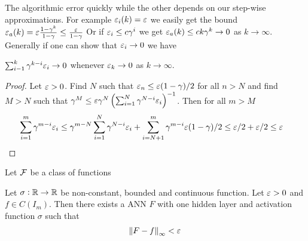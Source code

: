 The algorithmic error quickly while the other depends on our
step-wise approximations. For example
$\varepsilon_i(k) = \varepsilon$ we easily get the bound
$ \varepsilon_a(k) = \varepsilon \frac{1-\gamma^k}{1-\gamma} \leq \frac{\varepsilon}{1-\gamma} $
Or if $\varepsilon_i \leq c\gamma^i$ we get $\varepsilon_a(k) \leq ck \gamma^k \to 0$ as
$k \to \infty$.
Generally if one can show that $\varepsilon_i \to 0$ we have
\begin{prop} $ \sum_{i-1}^k \gamma^{k-i} \varepsilon_i \to 0 $
  whenever $\varepsilon_k \to 0$ as $k \to \infty$.
\end{prop}
\begin{proof}
  Let $\varepsilon > 0$. Find $N$ such that $\varepsilon_n \leq \varepsilon (1-\gamma)/2$ 
  for all $n>N$ and find $M>N$ such that
  $\gamma^M \leq
  \varepsilon \gamma^N \left( \sum_{i=1}^N \gamma^{N-i} \varepsilon_i \right)^{-1}$.
  Then for all $m>M$
  \begin{align*}
    \sum_{i=1}^m \gamma^{m-i} \varepsilon_i
    &\leq \gamma^{m-N} \sum_{i=1}^N \gamma^{N-i} \varepsilon_i
    + \sum_{i=N+1}^m \gamma^{m-i} \varepsilon (1-\gamma)/2
    \leq \varepsilon/2 + \varepsilon/2 \leq \varepsilon
  \end{align*}
\end{proof}

Let $\mathcal{F}$ be a class of functions

\begin{thm}
  Let $\sigma: \mathbb{R} \to \mathbb{R}$ be non-constant, bounded and continuous function.
  Let $\varepsilon > 0$ and $f \in C(I_m)$.
  Then there exists a ANN $F$ with one hidden layer
  and activation function $\sigma$ such that
  \[ \norm{F - f}_\infty < \varepsilon \]
\end{thm}

